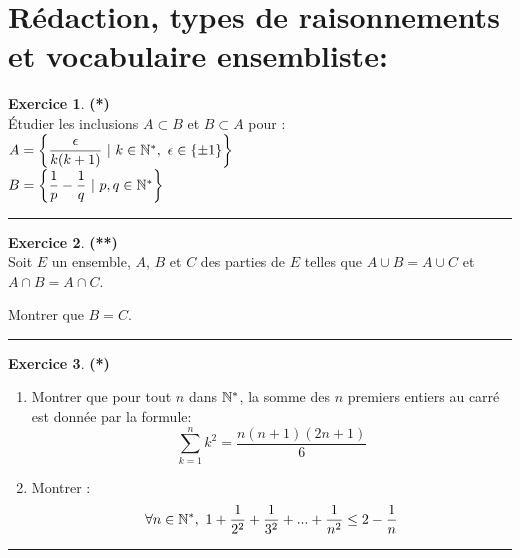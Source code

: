 \documentclass[a4paper,11pt]{article}
\theoremstyle{definition}
\newtheorem{exo}{Exercice} %
\begin{document}
 	
	

\noindent{}
\bigskip


\raggedright

\section*{Rédaction, types de raisonnements et vocabulaire ensembliste:}%

		
		
\begin{exo}\textbf{(*)}\quad\\[0.2cm]
	Étudier les inclusions $A \subset B$ et $B \subset A$ pour :\\[0.2cm]
	$A = \left\{\dfrac{\epsilon}{k(k+1)} \ | \ k\in\N^*,\ \epsilon\in\{\pm1\}\right\}$\\[0.2cm]
	$B = \left\{\dfrac{1}{p} - \dfrac{1}{q}\ | \ p,q\in\N^*\right\}$
	
	\centering
	\rule{1\linewidth}{0.6pt}
\end{exo}	

\begin{exo}\textbf{(**)}\quad\\[0.2cm]
	Soit $E$ un ensemble, $A$, $B$ et $C$ des parties de $E$ telles que $A \cup B = A \cup C$ et $A \cap B = A \cap C$. 
	
	\noindent Montrer que $B = C$.
	
	\centering
	\rule{1\linewidth}{0.6pt}
\end{exo}

\begin{exo}\textbf{(*)}\quad\\[0.2cm]	
	
	\begin{enumerate}
		\item Montrer que pour tout $n$ dans $\mathbb{N}^*$, la somme des $n$ premiers entiers au carré est donnée par la formule:
		$$\displaystyle \sum_{k=1}^{n}k^2 = 
		\dfrac{n(n + 1)(2n+1)
		}{6}$$ 
		\item Montrer :
		$$\forall n \in \mathbb{N}^*, \ 1+ \dfrac{1}{2^2}+\dfrac{1}{3^2} + ...+ \dfrac{1}{n^2} \leq 2 - \dfrac{1}{n}$$
	\end{enumerate}
	
	\centering
	\rule{1\linewidth}{0.6pt}
\end{exo}
\end{document}
